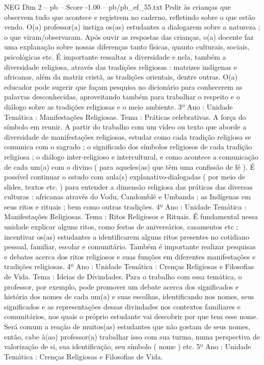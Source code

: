 \begin{textsample}{NEG Dim 2 – pb – Score -1.00 – pb/pb\_ef\_55.txt}
Pedir às crianças que observem tudo que acontece e registrem no caderno, refletindo sobre o que estão vendo.
O(a) professor(a) instiga os(as) estudantes a dialogarem sobre a natureza ; o que viram/observaram.
Após ouvir as respostas das crianças, o(a) docente faz uma explanação sobre nossas diferenças tanto físicas, quanto culturais, sociais, psicológicas etc.
É importante ressaltar a diversidade e nela, também a diversidade religiosa, através das tradições religiosas : matrizes indígenas e africanas, além da matriz cristã, as tradições orientais, dentre outras.
O(a) educador pode sugerir que façam pesquisa no dicionário para conhecerem as palavras desconhecidas, aproveitando também para trabalhar o respeito e o diálogo sobre as tradições religiosas e o meio ambiente. 3º Ano : Unidade Temática : Manifestações Religiosas.
Tema : Práticas celebrativas.
A força do símbolo em reunir.
A partir do trabalho com um vídeo ou texto que aborde a diversidade de manifestações religiosas, estudar como cada tradição religiosa se comunica com o sagrado ; o significado dos símbolos religiosos de cada tradição religiosa ; o diálogo inter-religioso e intercultural, e como acontece a comunicação de cada um(a) com o divino ( para aqueles(as) que têm uma confissão de fé ).
É possível continuar o estudo com aula(s) explanativo-dialogadas ( por meio de slides, textos etc. ) para entender a dimensão religiosa das práticas das diversas culturas : africanas através do Vodu, Candomblé e Umbanda ; as Indígenas em seus ritos e rituais ; bem como outras tradições. 4º Ano : Unidade Temática : Manifestações Religiosas.
Tema : Ritos Religiosos e Rituais.
É fundamental nessa unidade explicar alguns ritos, como festas de aniversários, casamentos etc ; incentivar os(as) estudantes a identificarem alguns ritos presentes no cotidiano pessoal, familiar, escolar e comunitário.
Também é importante realizar pesquisas e debates acerca dos ritos religiosos e suas funções em diferentes manifestações e tradições religiosas. 4º Ano : Unidade Temática : Crenças Religiosas e Filosofias de Vida.
Tema : Ideias de Divindades.
Para o trabalho com essa temática, o professor, por exemplo, pode promover um debate acerca dos significados e história dos nomes de cada um(a) e suas escolhas, identificando nos nomes, seus significados e as representações dessas divindades nos contextos familiares e comunitários, nos quais o próprio estudante vai descobrir por que tem esse nome.
Será comum a reação de muitos(as) estudantes que não gostam de seus nomes, então, cabe à(ao) professor(a) trabalhar isso com sua turma, numa perspectiva de valorização de si, sua identificação, seu símbolo ( nome ) etc. 5º Ano : Unidade Temática : Crenças Religiosas e Filosofias de Vida.

\end{textsample}
